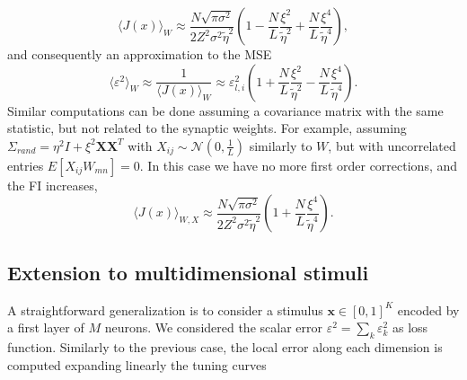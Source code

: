 \documentclass[a4paper]{article}%
\begin{document}
\begin{equation}
\langle J(x)\rangle_{W} \approx\frac{N \sqrt{\pi\sigma^{2}}}{2 Z^{2}
\sigma^{2}\tilde\eta^{2}}(1 -\frac{N}{L}\frac{\xi^{2}}{\tilde\eta^{2}} +
\frac{N}{L}\frac{\xi^{4}}{\tilde\eta^{4}}),
\end{equation}
and consequently an approximation to the MSE
\begin{equation}
\langle\varepsilon^{2}\rangle_{W} \approx\frac{1}{\langle J(x)\rangle_{W}}
\approx\varepsilon_{l,i}^{2} (1+\frac{N}{L}\frac{\xi^{2}}{\tilde\eta^{2}}-
\frac{N}{L}\frac{\xi^{4}}{\tilde\eta^{4}}).
\end{equation}
Similar computations can be done assuming a covariance matrix with the same
statistic, but not related to the synaptic weights. For example, assuming
$\Sigma_{rand} = \eta^{2} I + \xi^{2} \mathbf{X}\mathbf{X}^{T}$ with $X_{ij}
\sim\mathcal{N}(0,\frac{1}{L})$ similarly to $W$, but with uncorrelated
entries $E[X_{ij}W_{mn}] = 0$. In this case we have no more first order
corrections, and the FI increases,
\begin{equation}
\langle J(x)\rangle_{W,X} \approx\frac{N \sqrt{\pi\sigma^{2}}}{2 Z^{2}
\sigma^{2}\tilde\eta^{2}}(1 + \frac{N}{L}\frac{\xi^{4}}{\tilde\eta^{4}}).
\end{equation}


\subsection{Extension to multidimensional stimuli}

A straightforward generalization is to consider a stimulus $\mathbf{x}
\in[0,1]^{K}$ encoded by a first layer of $M$ neurons. We considered the
scalar error $\varepsilon^{2} = \sum_{k} \varepsilon_{k}^{2}$ as loss
function. Similarly to the previous case, the local error along each dimension
is computed expanding linearly the tuning curves%
\end{document}
